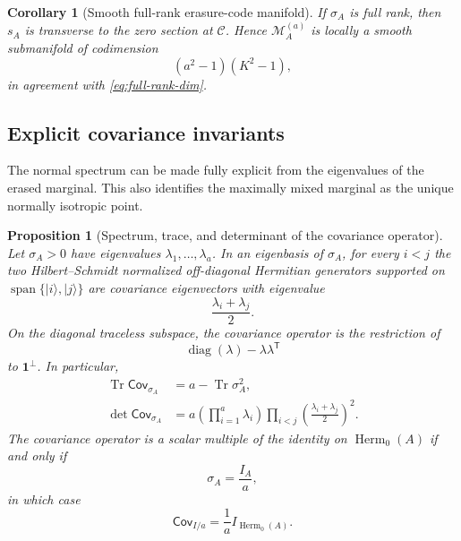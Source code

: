 \documentclass[11pt]{article}
\newtheorem{proposition}[theorem]{Proposition}
\newtheorem{corollary}[theorem]{Corollary}
\theoremstyle{definition}
\newcommand{\cC}{\mathcal C}
\newcommand{\cM}{\mathcal M}
\newcommand{\Herm}{\operatorname{Herm}}
\newcommand{\Tr}{\operatorname{Tr}}
\newcommand{\1}{\mathbf 1}
\newcommand{\ket}[1]{\lvert #1\rangle}
\begin{document}
\begin{corollary}[Smooth full-rank erasure-code manifold]
\label{cor:smooth}
If $\sigma_A$ is full rank, then $s_A$ is transverse to the zero section at $\cC$.  Hence $\cM_A^{(a)}$ is locally a smooth submanifold of codimension
\[
(a^2-1)(K^2-1),
\]
in agreement with \eqref{eq:full-rank-dim}.
\end{corollary}


\subsection{Explicit covariance invariants}

The normal spectrum can be made fully explicit from the eigenvalues of the erased marginal.  This also identifies the maximally mixed marginal as the unique normally isotropic point.

\begin{proposition}[Spectrum, trace, and determinant of the covariance operator]
\label{prop:cov-spectrum}
Let $\sigma_A>0$ have eigenvalues $\lambda_1,\ldots,\lambda_a$.  In an eigenbasis of $\sigma_A$, for every $i<j$ the two Hilbert--Schmidt normalized off-diagonal Hermitian generators supported on $\operatorname{span}\{\ket i,\ket j\}$ are covariance eigenvectors with eigenvalue
\begin{equation}
\frac{\lambda_i+\lambda_j}{2}.
\label{eq:offdiag-cov}
\end{equation}
On the diagonal traceless subspace, the covariance operator is the restriction of
\[
\operatorname{diag}(\lambda)-\lambda\lambda^{\mathsf T}
\]
to $\mathbf 1^\perp$.  In particular,
\begin{align}
\Tr\mathsf{Cov}_{\sigma_A}
&=a-\Tr\sigma_A^2,
\label{eq:cov-trace}\\
\det\mathsf{Cov}_{\sigma_A}
&=
a\left(\prod_{i=1}^a\lambda_i\right)
\prod_{i<j}
\left(\frac{\lambda_i+\lambda_j}{2}\right)^2.
\label{eq:cov-det}
\end{align}
The covariance operator is a scalar multiple of the identity on $\Herm_0(A)$ if and only if
\begin{equation}
\sigma_A=\frac{I_A}{a},
\end{equation}
in which case
\begin{equation}
\mathsf{Cov}_{I/a}=\frac1a I_{\Herm_0(A)}.
\label{eq:maxmix-cov}
\end{equation}
\end{proposition}
\end{document}
